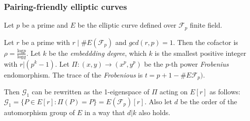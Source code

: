 
\subsubsection{Pairing-friendly elliptic curves}
\label{sec:apx.ecc.curves.pairing}

Let $p$ be a prime and $E$ be the elliptic curve
defined over $\mathcal{F}_p$ finite field.


Let $r$ be a prime with $r \mid \# E(\mathcal{F}_p)$ and $gcd(r,p)=1$.
Then the cofactor is $\rho = \frac{\mathrm{log} p}{\mathrm{log} q}$.
Let $k$ be the \textit{embeddding degree}, which $k$ is the smallest positive integer
with $r | (p^k -1)$. Let $\Pi: (x,y) \rightarrow  (x^p,y^p) $ be the $p$-th
power \textit{Frobenius} endomorphism. The trace of the \textit{Frobenious} is
$t = p+1 - \#E\mathcal{F}_p)$.\cite{ecc.pairings.param}



Then $\mathcal{G}_1$ can be rewritten as the 1-eigenspace of $\Pi$ acting
on $E[r]$ as follows: $\mathcal{G}_1 = \{ P \in E[r]: \Pi(P) = P\} = E(\mathcal{F}_p)[r]$.
Also let $d$ be the order of the automorphism group of $E$ in a way that $d | k$ also holds.\cite{ecc.pairings.param}

